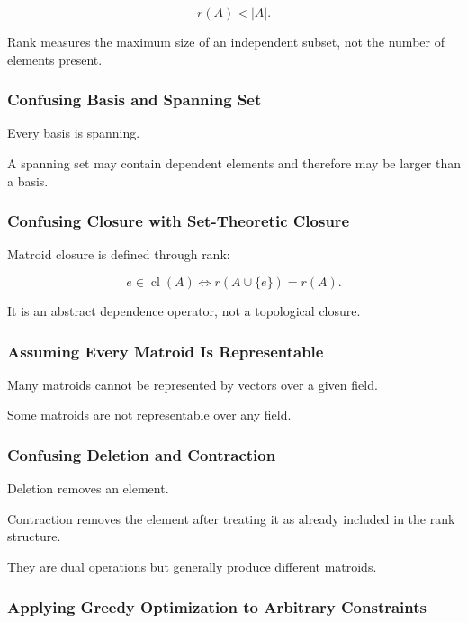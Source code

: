 \[
r(A)<|A|.
\]

Rank measures the maximum size of an independent subset, not the number
of elements present.

\subsubsection{Confusing Basis and Spanning Set}

Every basis is spanning.

A spanning set may contain dependent elements and therefore may be
larger than a basis.

\subsubsection{Confusing Closure with Set-Theoretic Closure}

Matroid closure is defined through rank:

\[
e\in\operatorname{cl}(A)
\iff
r(A\cup\{e\})=r(A).
\]

It is an abstract dependence operator, not a topological closure.

\subsubsection{Assuming Every Matroid Is Representable}

Many matroids cannot be represented by vectors over a given field.

Some matroids are not representable over any field.

\subsubsection{Confusing Deletion and Contraction}

Deletion removes an element.

Contraction removes the element after treating it as already included
in the rank structure.

They are dual operations but generally produce different matroids.

\subsubsection{Applying Greedy Optimization to Arbitrary Constraints}

